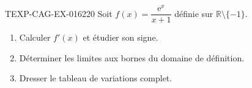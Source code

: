 \begin{exercice}{TEXP-CAG-EX-016}{2}{20}
Soit $f(x) = \dfrac{\mathrm{e}^x}{x+1}$ définie sur $\mathbb{R} \setminus \{-1\}$.
\begin{enumerate}
  \item Calculer $f'(x)$ et étudier son signe.
  \item Déterminer les limites aux bornes du domaine de définition.
  \item Dresser le tableau de variations complet.
\end{enumerate}

\end{exercice}
